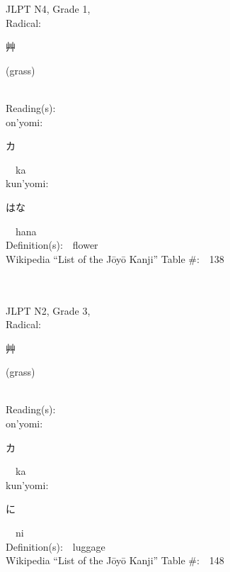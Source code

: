 \begin{multicols}{2}
{JLPT N4, Grade 1, \\Radical:\ \ {\begin{CJK}{UTF8}{min} 艸 \end{CJK}} (grass) } \\
Reading(s):\ \ \\
{\hspace*{1em}}on'yomi:\ \ \\
{\hspace*{2em}}{\begin{CJK}{UTF8}{min} カ \end{CJK}}\ \ ka\ \ \\
{\hspace*{1em}}kun'yomi:\ \ \\
{\hspace*{2em}}{\begin{CJK}{UTF8}{min} はな \end{CJK}}\ \ hana\ \ \\
Definition(s):\ \ flower \\
Wikipedia ``List of the J\=oy\=o Kanji'' Table \#:\ \ 138 \\
\ \ \\
{\fontsize{34pt}{40pt}  }\ \ \\  %
{JLPT N2, Grade 3, \\Radical:\ \ {\begin{CJK}{UTF8}{min} 艸 \end{CJK}} (grass) } \\
Reading(s):\ \ \\
{\hspace*{1em}}on'yomi:\ \ \\
{\hspace*{2em}}{\begin{CJK}{UTF8}{min} カ \end{CJK}}\ \ ka\ \ \\
{\hspace*{1em}}kun'yomi:\ \ \\
{\hspace*{2em}}{\begin{CJK}{UTF8}{min} に \end{CJK}}\ \ ni\ \ \\
Definition(s):\ \ luggage \\
Wikipedia ``List of the J\=oy\=o Kanji'' Table \#:\ \ 148 \\

\end{multicols}
